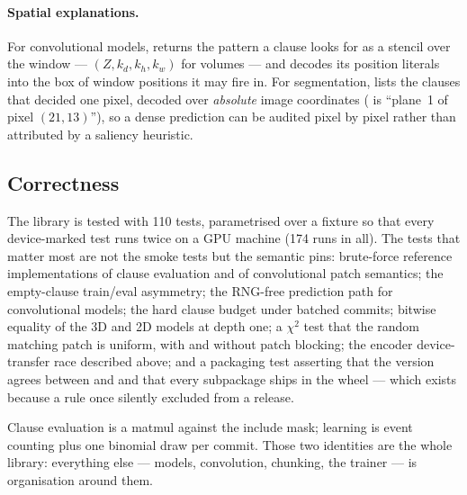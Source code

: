 \paragraph{Spatial explanations.} For convolutional models,  returns
the pattern a clause looks for as a stencil over the window --- $(Z, k_d, k_h, k_w)$ for
volumes --- and  decodes its position literals into the box of window
positions it may fire in. For segmentation,  lists the
clauses that decided one pixel, decoded over \emph{absolute} image coordinates
( is ``plane~1 of pixel $(21,13)$''), so a dense prediction can be audited
pixel by pixel rather than attributed by a saliency heuristic.

\subsection{Correctness}

The library is tested with 110 tests, parametrised over a  fixture so that every
device-marked test runs twice on a GPU machine (174 runs in all). The tests that matter most are not the
smoke tests but the semantic pins: brute-force reference implementations of clause evaluation
and of convolutional patch semantics; the empty-clause train\slash eval asymmetry; the
RNG-free prediction path for convolutional models; the hard clause budget under batched
commits; bitwise equality of the 3D and 2D models at depth one; a $\chi^2$ test that the
random matching patch is uniform, with and without patch blocking; the encoder device-transfer race described
above; and a packaging test asserting that the version agrees between
 and  and that every subpackage ships in the wheel
--- which exists because a  rule once silently excluded
 from a release.

\begin{ttkey}
Clause evaluation is a matmul against the include mask; learning is event counting plus one
binomial draw per commit. Those two identities are the whole library: everything else ---
models, convolution, chunking, the trainer --- is organisation around them.
\end{ttkey}
